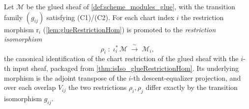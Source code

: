 \begin{definition}

  \label{def:glueRestrictionIso}
  Let \(\mathcal{M}\) be the glued sheaf of \cref{def:scheme_modules_glue}, with the
  transition family \((g_{ij})\) satisfying (C1)/(C2). For each chart index \(i\) the
  restriction morphism \(\mathrm{r}_i\) (\cref{lem:glueRestrictionHom}) is promoted to
  the \emph{restriction isomorphism}
  \[
    \rho_i \;:\; \iota_i^{*}\,\mathcal{M} \;\xrightarrow{\ \sim\ }\; \mathcal{M}_i,
  \]
  the canonical identification of the chart restriction of the glued sheaf with the
  \(i\)-th input sheaf, packaged from \cref{thm:isIso_glueRestrictionHom}. Its
  underlying morphism is the adjoint transpose of the \(i\)-th descent-equalizer
  projection, and over each overlap \(V_{ij}\) the two restrictions \(\rho_i, \rho_j\)
  differ exactly by the transition isomorphism \(g_{ij}\).
\end{definition}
